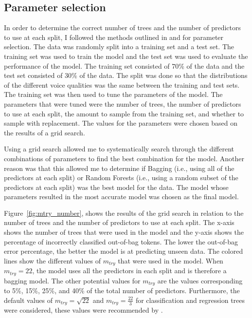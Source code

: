 \subsection{Parameter selection} \label{sec:bagging_model}

In order to determine the correct number of trees and the number of predictors to use at each split, I followed the methods outlined in \citet{boehmkeHandsOnMachineLearning2019} and \citet{jamesIntroductionStatisticalLearning2021} for parameter selection. The data was randomly split into a training set and a test set. The training set was used to train the model and the test set was used to evaluate the performance of the model. The training set consisted of 70\% of the data and the test set consisted of 30\% of the data. The split was done so that the distributions of the different voice qualities was the same between the training and test sets. The training set was then used to tune the parameters of the model. The parameters that were tuned were the number of trees, the number of predictors to use at each split, the amount to sample from the training set, and whether to sample with replacement. The values for the parameters were chosen based on the results of a grid search.

Using a grid search allowed me to systematically search through the different combinations of parameters to find the best combination for the model. Another reason was that this allowed me to determine if Bagging (i.e., using all of the predictors at each split) or Random Forests (i.e., using a random subset of the predictors at each split) was the best model for the data. The model whose parameters resulted in the most accurate model was chosen as the final model. 

Figure~\ref{fig:mtry_number}, shows the results of the grid search in relation to the number of trees and the number of predictors to use at each split. The x-axis shows the number of trees that were used in the model and the y-axis shows the percentage of incorrectly classified out-of-bag tokens. The lower the out-of-bag error percentage, the better the model is at predicting unseen data. The colored lines show the different values of $m_{try}$ that were used in the model. When $m_{try} = 22$, the model uses all the predictors in each split and is therefore a bagging model. The other potential values for $m_{try}$ are the values corresponding to 5\%, 15\%, 25\%, and 40\% of the total number of predictors. Furthermore, the default values of $m_{try} = \sqrt{22}$ and $m_{try} = \frac{22}{3}$ for classification and regression trees were considered, these values were recommended by \citet{boehmkeHandsOnMachineLearning2019}. 

